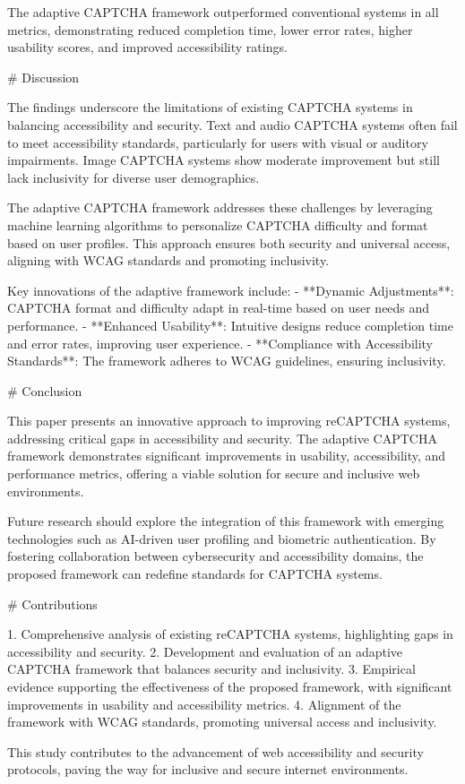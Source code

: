 The adaptive CAPTCHA framework outperformed conventional systems in all metrics, demonstrating reduced completion time, lower error rates, higher usability scores, and improved accessibility ratings.

# Discussion

The findings underscore the limitations of existing CAPTCHA systems in balancing accessibility and security. Text and audio CAPTCHA systems often fail to meet accessibility standards, particularly for users with visual or auditory impairments. Image CAPTCHA systems show moderate improvement but still lack inclusivity for diverse user demographics.

The adaptive CAPTCHA framework addresses these challenges by leveraging machine learning algorithms to personalize CAPTCHA difficulty and format based on user profiles. This approach ensures both security and universal access, aligning with WCAG standards and promoting inclusivity.

Key innovations of the adaptive framework include:
- **Dynamic Adjustments**: CAPTCHA format and difficulty adapt in real-time based on user needs and performance.
- **Enhanced Usability**: Intuitive designs reduce completion time and error rates, improving user experience.
- **Compliance with Accessibility Standards**: The framework adheres to WCAG guidelines, ensuring inclusivity.

# Conclusion

This paper presents an innovative approach to improving reCAPTCHA systems, addressing critical gaps in accessibility and security. The adaptive CAPTCHA framework demonstrates significant improvements in usability, accessibility, and performance metrics, offering a viable solution for secure and inclusive web environments.

Future research should explore the integration of this framework with emerging technologies such as AI-driven user profiling and biometric authentication. By fostering collaboration between cybersecurity and accessibility domains, the proposed framework can redefine standards for CAPTCHA systems.

# Contributions

1. Comprehensive analysis of existing reCAPTCHA systems, highlighting gaps in accessibility and security.
2. Development and evaluation of an adaptive CAPTCHA framework that balances security and inclusivity.
3. Empirical evidence supporting the effectiveness of the proposed framework, with significant improvements in usability and accessibility metrics.
4. Alignment of the framework with WCAG standards, promoting universal access and inclusivity.

This study contributes to the advancement of web accessibility and security protocols, paving the way for inclusive and secure internet environments.